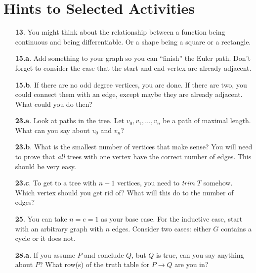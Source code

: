 \documentclass[10pt,]{book}
\theoremstyle{plain}
\theoremstyle{definition}
\theoremstyle{definition}
\theoremstyle{definition}
\numberwithin{equation}{chapter}
\def\imp{\rightarrow}
\begin{document}
\chapter[{Hints to Selected Activities}]{Hints to Selected Activities}\label{appendix-3}
\begin{itemize}[itemsep=1em]
\item[\textbf{13}.]\hypertarget{p-168}{}%
You might think about the relationship between a function being continuous and being differentiable.  Or a shape being a square or a rectangle.%

\item[\textbf{15.a}.]\hypertarget{p-181}{}%
Add something to your graph so you can ``finish'' the Euler path.  Don't forget to consider the case that the start and end vertex are already adjacent.%

\item[\textbf{15.b}.]\hypertarget{p-183}{}%
If there are no odd degree vertices, you are done.  If there are two, you could connect them with an edge, except maybe they are already adjacent.  What could you do then?%

\item[\textbf{23.a}.]\hypertarget{p-242}{}%
Look at paths in the tree.  Let \(v_0, v_1, \ldots, v_n\) be a path of maximal length.  What can you say about \(v_0\) and \(v_n\)?%

\item[\textbf{23.b}.]\hypertarget{p-244}{}%
What is the smallest number of vertices that make sense?  You will need to prove that \emph{all} trees with one vertex have the correct number of edges.  This should be very easy.%

\item[\textbf{23.c}.]\hypertarget{p-246}{}%
To get to a tree with \(n-1\) vertices, you need to \emph{trim} \(T\) somehow.  Which vertex should you get rid of?  What will this do to the number of edges?%

\item[\textbf{25}.]\hypertarget{p-258}{}%
You can take \(n = e = 1\) as your base case.  For the inductive case, start with an arbitrary graph with \(n\) edges.  Consider two cases: either \(G\) contains a cycle or it does not.%

\item[\textbf{28.a}.]\hypertarget{p-280}{}%
If you assume \(P\) and conclude \(Q\), but \(Q\) is true, can you say anything about \(P\)?  What row(s) of the truth table for \(P \imp Q\) are you in?%


\end{itemize}
\end{document}
